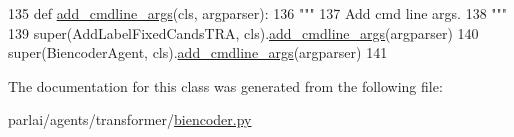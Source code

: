\begin{DoxyCode}
135     \textcolor{keyword}{def }\hyperlink{namespaceparlai_1_1agents_1_1drqa_1_1config_a62fdd5554f1da6be0cba185271058320}{add\_cmdline\_args}(cls, argparser):
136         \textcolor{stringliteral}{"""}
137 \textcolor{stringliteral}{        Add cmd line args.}
138 \textcolor{stringliteral}{        """}
139         super(AddLabelFixedCandsTRA, cls).\hyperlink{namespaceparlai_1_1agents_1_1drqa_1_1config_a62fdd5554f1da6be0cba185271058320}{add\_cmdline\_args}(argparser)
140         super(BiencoderAgent, cls).\hyperlink{namespaceparlai_1_1agents_1_1drqa_1_1config_a62fdd5554f1da6be0cba185271058320}{add\_cmdline\_args}(argparser)
141 \end{DoxyCode}


The documentation for this class was generated from the following file\+:\begin{DoxyCompactItemize}
\item 
parlai/agents/transformer/\hyperlink{biencoder_8py}{biencoder.\+py}\end{DoxyCompactItemize}
